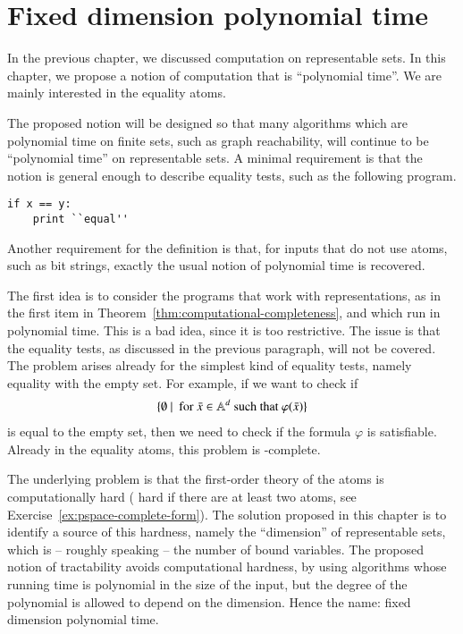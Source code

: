 \chapter{Fixed dimension polynomial time} 
\label{sec:poly} 

In the previous chapter, we discussed computation on representable sets. In this chapter, we propose a notion of computation that  is  ``polynomial time''. We are mainly interested in the equality atoms.

The proposed notion will  be designed so that many algorithms which are polynomial time on finite sets, such as graph reachability, will continue to be ``polynomial time'' on representable sets.  A minimal requirement is that the notion is general enough to describe equality tests, such as  the following program.
\begin{lstlisting}
if x == y:
    print ``equal''
\end{lstlisting}
Another requirement for the definition is that, for inputs that do not use atoms, such as bit strings, exactly the usual notion of polynomial time is recovered. 

 The first idea  is to consider the programs that work with representations, as in  the first item in Theorem~\ref{thm:computational-completeness}, and which run in polynomial time.  This is a bad idea, since it is too restrictive. The issue is that the equality tests, as discussed in the previous paragraph,  will not be covered. The problem arises already for the simplest kind of equality tests, namely equality with the empty set.  For example, if we want to check if  
 \begin{align*}
     \{\emptyset\ |\ \text{ for }\bar x \in \mathbb A^{d} \text{ such that }\varphi(\bar x)\}
 \end{align*}
is equal to  the empty set, 
 then we need to check if the formula $\varphi$ is satisfiable. Already in the equality atoms, this problem is \pspace-complete.

The underlying problem is that the first-order theory of the atoms is computationally hard (\pspace\xspace hard if there are at least two atoms, see Exercise~\ref{ex:pspace-complete-form}). The solution proposed in this chapter is to identify a source of this hardness, namely the ``dimension'' of representable sets, which is -- roughly speaking -- the number of bound variables. The proposed notion of tractability avoids computational hardness, by using algorithms whose running time is polynomial in the size of the input, but the degree of the polynomial is allowed to depend on the dimension. Hence the name: fixed dimension polynomial time. 

